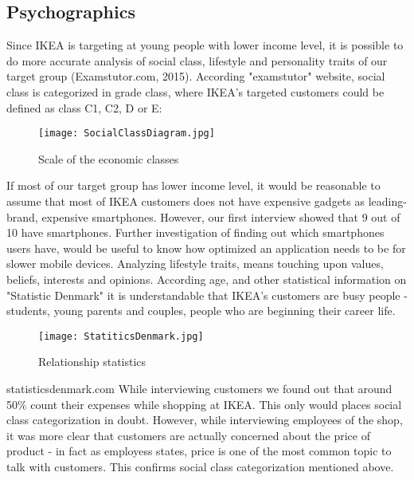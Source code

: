 \subsection{Psychographics}
Since IKEA is targeting at young people with lower income level, it is possible to do more accurate analysis of social class, lifestyle and personality traits of our target group (Examstutor.com,  2015). According "examstutor" website, social class is categorized in grade class, where IKEA’s targeted customers could be defined as class C1, C2, D or E:
\begin{figure}[H]
\centering
\texttt{[image: SocialClassDiagram.jpg]}
\caption{Scale of the economic classes}
\end{figure}
If most of our target group has lower income level, it would be reasonable to assume that most of IKEA customers does not have expensive gadgets as leading-brand, expensive smartphones. However, our first interview showed that 9 out of 10 have smartphones. Further investigation of finding out which smartphones users have, would be useful to know how optimized an application needs to be for slower mobile devices. 
Analyzing lifestyle traits, means touching upon values, beliefs, interests and opinions. According age, and other statistical information on "Statistic Denmark" it is understandable that IKEA’s customers are busy people - students, young parents and couples, people who are beginning their career life. 
\begin{figure}[H]
\centering
\texttt{[image: StatiticsDenmark.jpg]}
\caption{Relationship statistics}
\end{figure}
statisticsdenmark.com
While interviewing customers we found out that around 50\% count their expenses  while shopping at IKEA. This only would places social class categorization in doubt. However, while interviewing employees of the shop, it was more clear that customers are actually concerned about the price of product - in fact as employess states, price is one of the most common topic to talk with customers. This confirms social class categorization mentioned above. 
